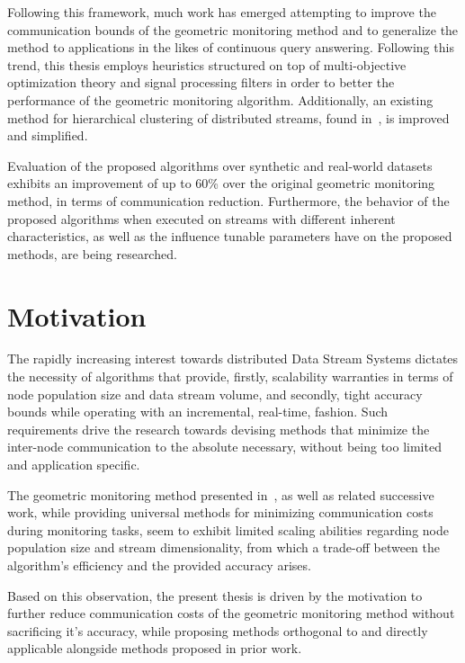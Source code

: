 Following this framework, much work has emerged attempting to improve the communication bounds of the geometric monitoring method and to generalize the method to applications in the likes of continuous query answering. Following this trend, this thesis employs heuristics structured on top of multi-objective optimization theory and signal processing filters in order to better the performance of the geometric monitoring algorithm. Additionally, an existing method for hierarchical clustering of distributed streams, found in~\cite{Sharfman2012ShapeSensGM}, is improved and simplified.

Evaluation of the proposed algorithms over synthetic and real-world datasets exhibits an improvement of up to 60\% over the original geometric monitoring method, in terms of communication reduction. Furthermore, the behavior of the proposed algorithms when executed on streams with different inherent characteristics, as well as the influence tunable parameters have on the proposed methods, are being researched.


\section{Motivation} \label{sec:intro-motivation}

The rapidly increasing interest towards distributed Data Stream Systems dictates the necessity of algorithms that provide, firstly, scalability warranties in terms of node population size and data stream volume, and secondly, tight accuracy bounds while operating with an incremental, real-time, fashion. Such requirements drive the research towards devising methods that minimize the inter-node communication to the absolute necessary, without being too limited and application specific.

The geometric monitoring method presented in~\cite{Sharfman2006GM}, as well as related successive work, while providing universal methods for minimizing communication costs during monitoring tasks, seem to exhibit limited scaling abilities regarding node population size and stream dimensionality, from which a trade-off between the algorithm's efficiency and the provided accuracy arises.

Based on this observation, the present thesis is driven by the motivation to further reduce communication costs of the geometric monitoring method without sacrificing it's accuracy, while proposing methods orthogonal to and directly applicable alongside methods proposed in prior work.


